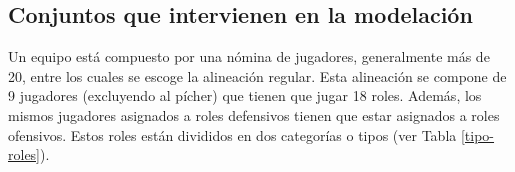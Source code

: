 \subsection{Conjuntos que intervienen en la modelación}\label{sec:conjuntos}
{\color{red}
Un equipo está compuesto por una nómina de jugadores, generalmente más de 20, entre los cuales se escoge la alineación regular. Esta alineación se compone de 9  jugadores (excluyendo al pícher) que tienen que jugar 18 roles. Además, los mismos jugadores asignados a roles defensivos tienen que estar asignados a roles ofensivos. Estos roles están divididos en dos categorías o tipos (ver Tabla \ref{tipo-roles}).
}
\begin{table}[H]
	\centering
	\caption{Tipos de roles}\label{tipo-roles}
\end{table}

